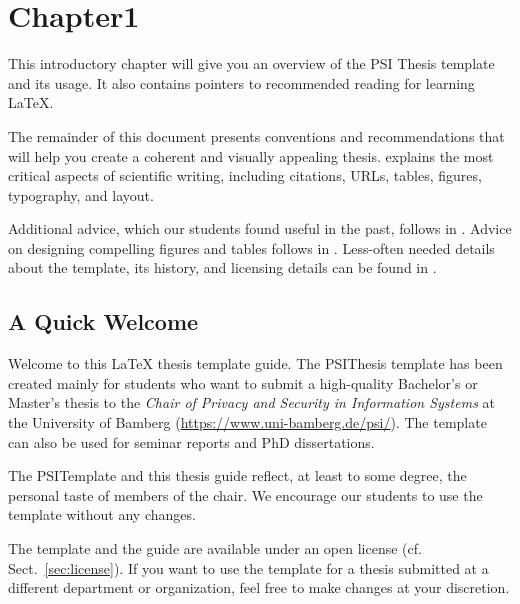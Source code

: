 \chapter{Chapter1} %

\label{Chapter1} %


This introductory chapter will give you an overview of the PSI Thesis template and its usage.
It also contains pointers to recommended reading for learning \LaTeX{}.

The remainder of this document presents conventions and recommendations that will help you create a coherent and visually appealing thesis.  explains the most critical aspects of scientific writing, including citations, URLs, tables, figures, typography, and layout.

Additional advice, which our students found useful in the past, follows in . Advice on designing compelling figures and tables follows in . Less-often needed details about the template, its history, and licensing details can be found in .

\section{A Quick Welcome}

Welcome to this LaTeX thesis template guide.%
The PSIThesis template has been created mainly for students who want to submit a high-quality Bachelor's or Master's thesis to the \emph{Chair of Privacy and Security in Information Systems} at the University of Bamberg (\url{https://www.uni-bamberg.de/psi/}). The template can also be used for seminar reports and PhD dissertations.

The PSITemplate and this thesis guide reflect, at least to some degree, the personal taste of members of the chair.
We encourage our students to use the template without any changes.

The template and the guide are available under an open license (cf. Sect.~\ref{sec:license}). If you want to use the template for a thesis submitted at a different department or organization, feel free to make changes at your discretion.

